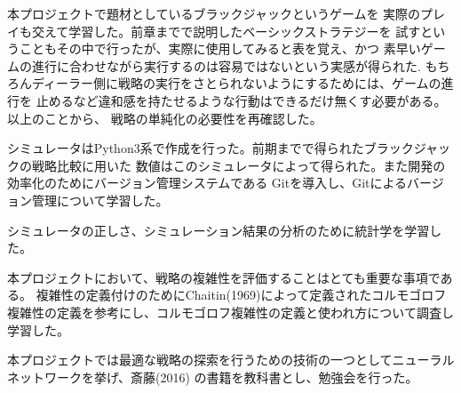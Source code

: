 本プロジェクトで題材としているブラックジャックというゲームを
実際のプレイも交えて学習した。前章までで説明したベーシックストラテジーを
試すということもその中で行ったが、実際に使用してみると表を覚え、かつ
素早いゲームの進行に合わせながら実行するのは容易ではないという実感が得られた.
もちろんディーラー側に戦略の実行をさとられないようにするためには、ゲームの進行を
止めるなど違和感を持たせるような行動はできるだけ無くす必要がある。以上のことから、
戦略の単純化の必要性を再確認した。

シミュレータはPython3系で作成を行った。前期までで得られたブラックジャックの戦略比較に用いた
数値はこのシミュレータによって得られた。また開発の効率化のためにバージョン管理システムである
Gitを導入し、Gitによるバージョン管理について学習した。

シミュレータの正しさ、シミュレーション結果の分析のために統計学を学習した。

本プロジェクトにおいて、戦略の複雑性を評価することはとても重要な事項である。
複雑性の定義付けのためにChaitin(1969)によって定義されたコルモゴロフ複雑性の定義を参考にし、コルモゴロフ複雑性の定義と使われ方について調査し学習した。

本プロジェクトでは最適な戦略の探索を行うための技術の一つとしてニューラルネットワークを挙げ、斎藤(2016) の書籍を教科書とし、勉強会を行った。

